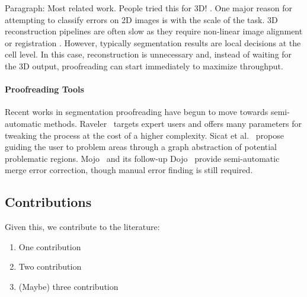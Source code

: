 Paragraph: Most related work. People tried this for 3D! \cite{BogovicHJ13}. 
One major reason for attempting to classify errors on 2D images is with the scale of the task. 3D reconstruction pipelines are often slow as they require non-linear image alignment or registration \cite{akselrod09,beyer13,Saalfeld2010Asrigidaspossible}. However, typically segmentation results are local decisions at the cell level. In this case, reconstruction is unnecessary and, instead of waiting for the 3D output, proofreading can start immediately to maximize throughput.



\paragraph{Proofreading Tools}
Recent works in segmentation proofreading have begun to move towards semi-automatic methods. Raveler~\cite{raveler} targets expert users and offers many parameters for tweaking the process at the cost of a higher complexity. Sicat et al.~\cite{markus_proofreading} propose guiding the user to problem areas through a graph abstraction of potential problematic regions. Mojo~\cite{mojo2} and its follow-up Dojo~\cite{haehn_dojo_2014} provide semi-automatic merge error correction, though manual error finding is still required.

\subsection{Contributions}

Given this, we contribute to the literature:
\begin{enumerate}
\item One contribution
\item Two contribution
\item (Maybe) three contribution
\end{enumerate}